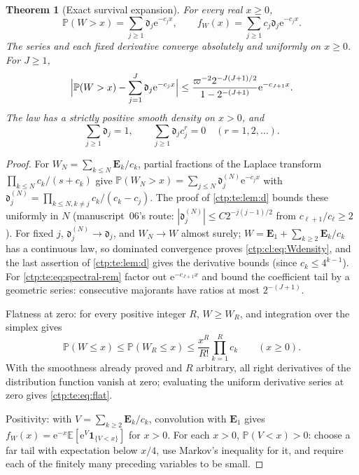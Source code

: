 \documentclass[11pt,a4paper]{article}
\numberwithin{equation}{section}
\newtheorem{theorem}{Theorem}[section]
\theoremstyle{definition}
\theoremstyle{remark}
\newcommand{\e}{\mathrm e}
\newcommand{\PP}{\mathbb P}
\newcommand{\E}{\mathbb E}
\newcommand{\ind}{\mathbf 1}
\newcommand{\sd}{\mathfrak d}
\begin{document}
\begin{theorem}[Exact survival expansion]\label{ctp:te:thm:spectral}
For every real $x\ge0$,
\begin{equation}\label{ctp:cl:eq:Wdensity}
 \PP(W>x)=\sum_{j\ge1}\sd_j\e^{-c_jx},\qquad
 f_W(x)=\sum_{j\ge1}c_j\sd_j\e^{-c_jx}.
\end{equation}
The series and each fixed derivative converge absolutely and uniformly on
$x\ge0$. For $J\ge1$,
\begin{equation}\label{ctp:te:eq:spectral-rem}
 \Bigl|\PP(W>x)-\sum_{j=1}^J\sd_j\e^{-c_jx}\Bigr|
 \le\frac{\varpi^{-2}2^{-J(J+1)/2}}{1-2^{-(J+1)}}\e^{-c_{J+1}x}.
\end{equation}
The law has a strictly positive smooth density on $x>0$, and
\begin{equation}\label{ctp:te:eq:flat}
 \sum_{j\ge1}\sd_j=1,\qquad\sum_{j\ge1}\sd_jc_j^r=0\quad(r=1,2,\ldots).
\end{equation}
\end{theorem}
\begin{proof}
For $W_N=\sum_{k\le N}\mathbf E_k/c_k$, partial fractions of the Laplace
transform $\prod_{k\le N}c_k/(s+c_k)$ give
$\PP(W_N>x)=\sum_{j\le N}\sd_j^{(N)}\e^{-c_jx}$ with
$\sd_j^{(N)}=\prod_{k\le N,k\ne j}c_k/(c_k-c_j)$. The proof of
\cref{ctp:te:lem:d} bounds these uniformly in $N$ (manuscript~06's route:
$|\sd^{(N)}_j|\le C2^{-j(j-1)/2}$ from $c_{\ell+1}/c_\ell\ge2$). For fixed $j$,
$\sd_j^{(N)}\to\sd_j$, and $W_N\to W$ almost surely; $W=\mathbf E_1+\sum_{k\ge2}\mathbf E_k/c_k$
has a continuous law, so dominated convergence proves \eqref{ctp:cl:eq:Wdensity},
and the last assertion of \cref{ctp:te:lem:d} gives the derivative bounds
(since $c_k\le4^{k-1}$). For \eqref{ctp:te:eq:spectral-rem} factor out
$\e^{-c_{J+1}x}$ and bound the coefficient tail by a geometric series:
consecutive majorants have ratios at most $2^{-(J+1)}$.

Flatness at zero: for every positive integer $R$, $W\ge W_R$, and
integration over the simplex gives
\begin{equation}\label{ctp:cl:eq:flatness}
 \PP(W\le x)\le\PP(W_R\le x)\le\frac{x^R}{R!}\prod_{k=1}^Rc_k\qquad(x\ge0).
\end{equation}
With the smoothness already proved and $R$ arbitrary, all right derivatives
of the distribution function vanish at zero; evaluating the uniform
derivative series at zero gives \eqref{ctp:te:eq:flat}.

Positivity: with $V=\sum_{k\ge2}\mathbf E_k/c_k$, convolution with
$\mathbf E_1$ gives $f_W(x)=\e^{-x}\E[\e^V\ind_{\{V<x\}}]$ for $x>0$. For
each $x>0$, $\PP(V<x)>0$: choose a far tail with expectation below $x/4$,
use Markov's inequality for it, and require each of the finitely many
preceding variables to be small.
\end{proof}
\end{document}

